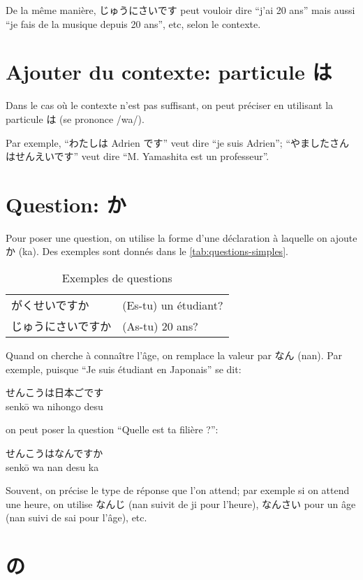 \documentclass[a4paper,10pt,french,openany]{memoir}
\begin{document}
De la même manière, じゅうにさいです peut vouloir dire ``j'ai 20 ans'' mais aussi ``je fais de la musique depuis 20 ans'', etc, selon le contexte.

\section{Ajouter du contexte: particule は}
Dans le cas où le contexte n'est pas suffisant, on peut préciser en utilisant la particule は (se prononce /wa/).

Par exemple, ``わたしは Adrien です'' veut dire ``je suis Adrien''; ``やましたさんはせんえいです'' veut dire ``M. Yamashita est un professeur''.

\section{Question: か}
Pour poser une question, on utilise la forme d'une déclaration à laquelle on ajoute か (ka). Des exemples sont donnés dans le \autoref{tab:questions-simples}.

\begin{table}[htbp]
 \centering
 \begin{tabular}{ll}
  がくせいですか & (Es-tu) un étudiant? \\
  じゅうにさいですか & (As-tu) 20 ans?
 \end{tabular}
 \caption{Exemples de questions}
 \label{tab:questions-simples}
\end{table}

Quand on cherche à connaître l'âge, on remplace la valeur par なん (nan). Par exemple, puisque ``Je suis étudiant en Japonais'' se dit:
\begin{center}
 せんこうは日本ごです\\
 senkō wa nihongo desu
\end{center}
on peut poser la question ``Quelle est ta filière ?'':
\begin{center}
 せんこうはなんですか\\
 senkō wa nan desu ka
\end{center}

Souvent, on précise le type de réponse que l'on attend; par exemple si on attend une heure, on utilise なんじ (nan suivit de ji pour l'heure), なんさい pour un âge (nan suivi de sai pour l'âge), etc.

\section{の}
\end{document}
